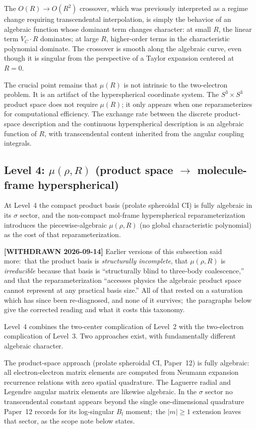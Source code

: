 \documentclass[aps,pra,twocolumn,superscriptaddress,longbibliography]{revtex4-2}
\begin{document}
The $O(R) \to O(R^2)$ crossover, which was previously interpreted
as a regime change requiring transcendental interpolation, is
simply the behavior of an algebraic function whose dominant term
changes character: at small $R$, the linear term $V_C \cdot R$
dominates; at large $R$, higher-order terms in the characteristic
polynomial dominate.  The crossover is smooth along the algebraic
curve, even though it is singular from the perspective of a Taylor
expansion centered at $R = 0$.

The crucial point remains that $\mu(R)$ is not intrinsic to the
two-electron problem.  It is an artifact of the hyperspherical
coordinate system.  The $S^3 \times S^3$ product space does not
require $\mu(R)$; it only appears when one reparameterizes for
computational efficiency.  The exchange rate between the discrete
product-space description and the continuous hyperspherical
description is an algebraic function of $R$, with transcendental
content inherited from the angular coupling integrals.


\subsection{Level 4: $\mu(\rho,R)$ (product space $\to$ molecule-frame hyperspherical)}
\label{sec:mu_level4}

At Level~4 the compact product basis (prolate spheroidal CI) is fully
algebraic in its $\sigma$ sector, and the non-compact mol-frame
hyperspherical reparameterization introduces the piecewise-algebraic
$\mu(\rho,R)$ (no global characteristic polynomial) as the cost of that
reparameterization.

\textbf{[WITHDRAWN 2026-09-14]} Earlier versions of this subsection said
more:\ that the product basis is \emph{structurally incomplete}, that
$\mu(\rho,R)$ is \emph{irreducible} because that basis is ``structurally
blind to three-body coalescence,'' and that the reparameterization
``accesses physics the algebraic product space cannot represent at any
practical basis size.''  All of that rested on a saturation which has since
been re-diagnosed, and none of it survives;\ the paragraphs below give the
corrected reading and what it costs this taxonomy.

Level~4 combines the two-center complication of Level~2 with the
two-electron complication of Level~3.  Two approaches exist, with
fundamentally different algebraic character.

The product-space approach (prolate spheroidal CI, Paper~12) is
fully algebraic: all electron-electron matrix elements are computed
from Neumann expansion recurrence relations with zero spatial
quadrature.  The Laguerre radial and Legendre angular matrix
elements are likewise algebraic.  In the $\sigma$ sector no
transcendental constant appears beyond the single one-dimensional
quadrature Paper~12 records for its log-singular $B_l$ moment;\ the
$|m| \ge 1$ extension leaves that sector, as the scope note below states.
\end{document}
